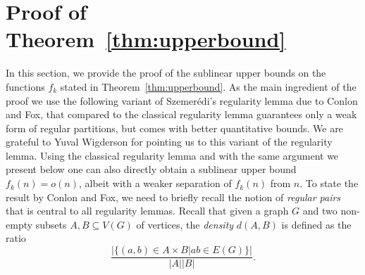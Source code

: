 \documentclass[a4paper,10pt,hidelinks]{amsart}
\theoremstyle{definition}
\begin{document}
\section{Proof of Theorem~\ref{thm:upperbound}}\label{sec:upper}
In this section, we provide the proof of the sublinear upper bounds on the functions $f_k$ stated in Theorem~\ref{thm:upperbound}. As the main ingredient of the proof we use the following variant of Szemer\'{e}di's regularity lemma due to Conlon and Fox, that compared to the classical regularity lemma guarantees only a weak form of regular partitions, but comes with better quantitative bounds. We are grateful to Yuval Wigderson for pointing us to this variant of the regularity lemma. Using the classical regularity lemma and with the same argument we present below one can also directly obtain a sublinear upper bound $f_k(n)=o(n)$, albeit with a weaker separation of $f_k(n)$ from $n$. 
To state the result by Conlon and Fox, we need to briefly recall the notion of \emph{regular pairs} that is central to all regularity lemmas. Recall that given a graph $G$ and two non-empty subsets $A, B\subseteq V(G)$ of vertices, the \emph{density} $d(A,B)$ is defined as the ratio 
$$\frac{|\{(a,b)\in A\times B|ab\in E(G)\}|}{|A||B|}.$$
\end{document}
